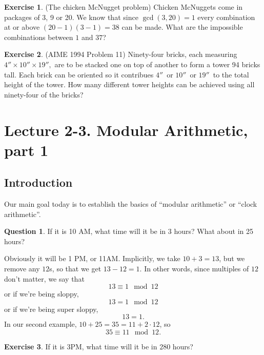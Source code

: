 \documentclass[11pt]{article}
\theoremstyle{definition}
\newtheorem{exercise}{Exercise}
\newtheorem{question}[thm]{Question}
\numberwithin{thm}{section}
\begin{document}
\begin{exercise} (The chicken McNugget problem) Chicken McNuggets come in packages of 3, 9 or 20. We know that since $\gcd(3,20) = 1$ every combination at or above $(20-1)(3-1) = 38$ can be made. What are the impossible combinations between $1$ and $37$?
\end{exercise}

\begin{exercise} (AIME 1994 Problem 11) Ninety-four bricks, each measuring $4''\times10''\times19'',$ are to be stacked one on top of another to form a tower 94 bricks tall. Each brick can be oriented so it contribues $4''\,$ or $10''\,$ or $19''\,$ to the total height of the tower. How many different tower heights can be achieved using all ninety-four of the bricks?
\end{exercise}


\newpage
\section{Lecture 2-3. Modular Arithmetic, part 1}


\subsection{Introduction}


Our main goal today is to establish the basics of ``modular arithmetic'' or ``clock arithmetic''.

\begin{question} If it is 10 AM, what time will it be in 3 hours? What about in 25 hours?
\end{question}

Obviously it will be 1 PM, or 11AM. Implicitly, we take $10+3=13$, but we remove any $12$s, so that we get $13 - 12 = 1$. In other words, since multiples of $12$ don't matter, we say that
\[
	13 \equiv 1 \mod 12
\]
or if we're being sloppy,
\[
	13 = 1 \mod 12
\]
or if we're being super sloppy,
\[
	13 = 1.
\]
In our second example, $10 + 25 = 35 = 11 + 2\cdot 12$, so
\[
	35 \equiv 11 \mod 12.
\]
\begin{exercise} If it is 3PM, what time will it be in $280$ hours?
\end{exercise}
\end{document}
